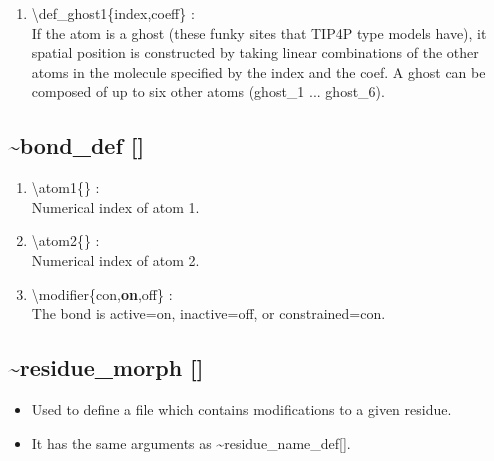 \documentclass[12pt,titlepage]{article}
\begin{document}
\begin{enumerate}
 \vspace{0.15in} 
 \item  \textbackslash def\_ghost1\{index,coeff\} : \\ 
    If the atom is a ghost (these funky sites that TIP4P type
    models have), it spatial position is constructed by taking linear 
    combinations of the other atoms in the molecule specified by the index 
    and the coef. A ghost can be composed of up to six other atoms
    (ghost\_1{} ... ghost\_6{}).

\end{enumerate}

\newpage
\subsection*{\bf \~{ }bond\_def []}

\begin{enumerate}
 \vspace{0.15in} 
 \item  \textbackslash atom1\{\} : \\
   Numerical index of atom 1.

 \vspace{0.15in} 
 \item  \textbackslash atom2\{\} : \\
   Numerical index of atom 2.

 \vspace{0.15in} 
 \item  \textbackslash modifier\{con,{\bf on},off\} : \\
   The bond is active=on, inactive=off, or constrained=con.

\end{enumerate}

\newpage

\subsection*{\bf \~{ }residue\_morph []}
\begin{itemize}
  \item Used to define a file which contains modifications to 
              a given residue.
  \item It has the same arguments as \~{ }residue\_name\_def[].
\end{itemize}
\end{document}
